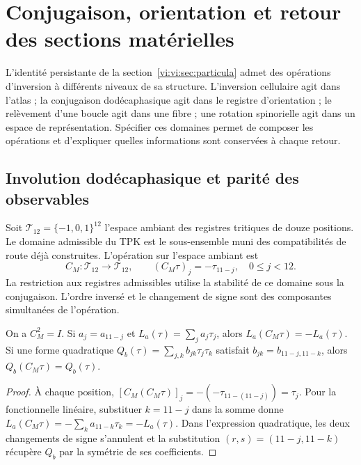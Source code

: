 \section{Conjugaison, orientation et retour des sections matérielles}
\label{vi:vi:sec:conjugacion}

L’identité persistante de la section~\ref{vi:vi:sec:particula} admet
des opérations d’inversion à différents niveaux de sa structure.
L’inversion cellulaire agit dans l’atlas ; la conjugaison dodécaphasique
agit dans le registre d’orientation ; le relèvement d’une boucle agit
dans une fibre ; une rotation spinorielle agit dans un espace de
représentation. Spécifier ces domaines permet de composer les
opérations et d’expliquer quelles informations sont conservées à chaque retour.

\subsection{Involution dodécaphasique et parité des observables}
\label{vi:vi:subsec:conjugacion-registro}

Soit $\mathcal T_{12}=\{-1,0,1\}^{12}$ l’espace ambiant des registres
tritiques de douze positions. Le domaine admissible du TPK est le
sous-ensemble muni des compatibilités de route déjà construites. L’opération
sur l’espace ambiant est
\begin{equation}
 C_M:\mathcal T_{12}\longrightarrow\mathcal T_{12},\qquad
 (C_M\tau)_j=-\tau_{11-j},\quad 0\leq j<12.
 \label{vi:vi:eq:cm}
\end{equation}
La restriction aux registres admissibles utilise la stabilité de ce
domaine sous la conjugaison. L’ordre inversé et le changement de signe
sont des composantes simultanées de l’opération.

\begin{proposition}
\label{vi:vi:prop:paridad-registro}
On a $C_M^2=I$. Si $a_j=a_{11-j}$ et
$L_a(\tau)=\sum_ja_j\tau_j$, alors
$L_a(C_M\tau)=-L_a(\tau)$. Si une forme quadratique
$Q_b(\tau)=\sum_{j,k}b_{jk}\tau_j\tau_k$ satisfait
$b_{jk}=b_{11-j,11-k}$, alors $Q_b(C_M\tau)=Q_b(\tau)$.
\end{proposition}
\begin{proof}
À chaque position,
$[C_M(C_M\tau)]_j=-(-\tau_{11-(11-j)})=\tau_j$.
Pour la fonctionnelle linéaire, substituer $k=11-j$ dans la somme donne
$L_a(C_M\tau)=-\sum_ka_{11-k}\tau_k=-L_a(\tau)$.
Dans l’expression quadratique, les deux changements de signe s’annulent et
la substitution $(r,s)=(11-j,11-k)$ récupère $Q_b$ par la
symétrie de ses coefficients.
\end{proof}

